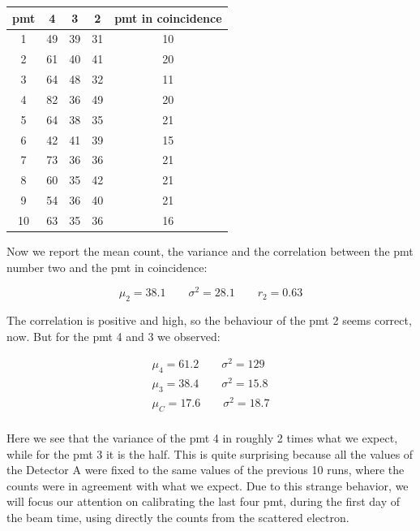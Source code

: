 \documentclass[10pt,a4paper]{article}
\begin{document}
\begin{center}
\begin{tabular}{|c|c|c|c|c|}
\hline 
pmt & 4 & 3 & 2 & pmt in coincidence \\ 
\hline 
1 & 49  & 39 & 31 & 10 \\ 
\hline 
2 & 61 & 40 & 41 & 20 \\ 
\hline 
3 & 64 & 48 & 32 & 11 \\ 
\hline 
4 & 82 & 36 & 49 & 20 \\ 
\hline 
5 & 64 & 38 & 35 & 21 \\ 
\hline 
6 & 42 & 41 & 39 & 15 \\ 
\hline 
7 & 73 & 36 & 36 & 21 \\ 
\hline 
8 & 60 & 35 & 42 & 21 \\ 
\hline 
9 & 54 & 36 & 40 & 21 \\ 
\hline 
10 & 63 & 35 & 36 & 16 \\ 
\hline 
\end{tabular} 
\end{center}

Now we report the mean count, the variance and the correlation between the pmt number two and the pmt in coincidence:

\begin{equation*}
\mu_{2} = 38.1 \qquad \sigma^{2} = 28.1 \qquad r_{2} = 0.63
\end{equation*}

The correlation is positive and high, so the behaviour of the pmt 2 seems correct, now. But for the pmt 4 and 3 we observed:

\begin{equation*}
\begin{split}
\mu_{4} = 61.2 \qquad \sigma^{2} = 129 \\
\mu_{3} = 38.4 \qquad \sigma^{2} = 15.8 \\
\mu_{C} = 17.6 \qquad \sigma^{2} = 18.7 \\
\end{split} 
\end{equation*}

Here we see that the variance of the pmt 4 in roughly 2 times what we expect, while for the pmt 3 it is the half. This is quite surprising because all the values of the Detector A were fixed to the same values of the previous 10 runs, where the counts were in agreement with what we expect. Due to this strange behavior, we will focus our attention on calibrating the last four pmt, during the first day of the beam time, using directly the counts from the scattered electron.
\end{document}
